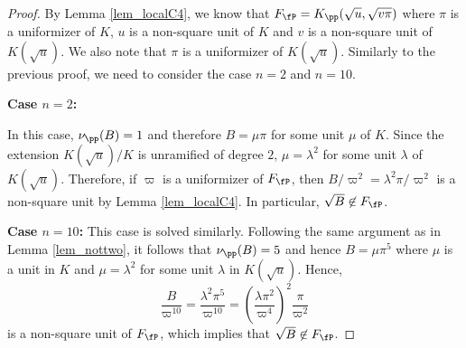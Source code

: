 \begin{proof}
    By Lemma \ref{lem_localC4}, we know that $F_\fP=K_\pp(\sqrt{u},\sqrt{v\pi})$ where $\pi$ is a uniformizer of $K$, $u$ is a non-square unit of $K$ and $v$ is a non-square unit of $K(\sqrt{u})$. We also note that $\pi$ is a uniformizer of $K(\sqrt{u})$.
    Similarly to the previous proof, we need to consider the case $n=2$ and $n=10$. 

    \textbf{Case $n=2$:}

    In this case, $\nu_\pp(B)=1$ and therefore $B=\mu\pi$ for some unit $\mu$ of $K$. Since the extension $K(\sqrt{u})/K$ is unramified of degree $2$, $\mu=\lambda^2$ for some unit $\lambda$ of $K(\sqrt{u})$. Therefore, if $\varpi$ is a uniformizer of $F_\fP$, then $B/\varpi^2=\lambda^2\pi/\varpi^2$ is a non-square unit by Lemma \ref{lem_localC4}. In particular, $\sqrt{B}\not\in F_\fP$.

    \textbf{Case $n=10$:}
    This case is solved similarly. Following the same argument as in Lemma \ref{lem_nottwo}, it follows that $\nu_\pp(B)=5$ and hence $B=\mu\pi^5$ where $\mu$ is a unit in $K$ and $\mu=\lambda^2$ for some unit $\lambda$ in $K(\sqrt{u})$. Hence,
    $$\frac{B}{\varpi^{10}}=\frac{\lambda^2\pi^5}{\varpi^{10}}=\left(\frac{\lambda\pi^2}{\varpi^4}\right)^2\frac{\pi}{\varpi^2}$$
    is a non-square unit of $F_\fP$, which implies that $\sqrt{B}\not\in F_\fP$.
\end{proof}



